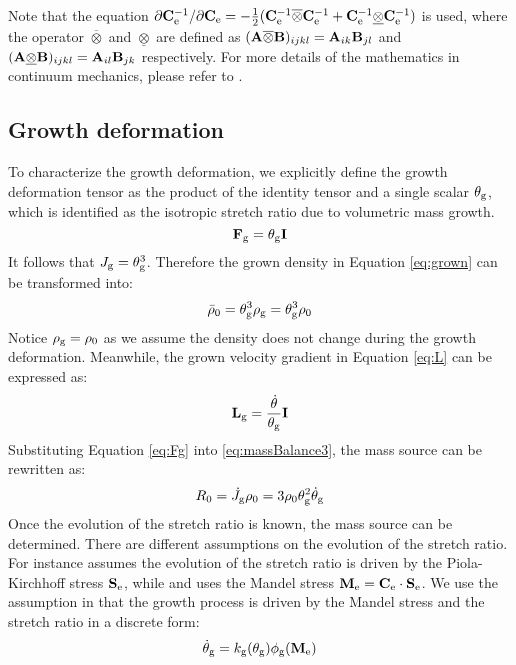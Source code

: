 Note that the equation $\partial\bold{C}_{\mathrm{e}}^{-1}/\partial\bold{C}_{\mathrm{e}} = -\frac{1}{2}(\bold{C}_{\mathrm{e}}^{-1} \overline\otimes \bold{C}_{\mathrm{e}}^{-1} + \bold{C}_{\mathrm{e}}^{-1} \underline\otimes \bold{C}_{\mathrm{e}}^{-1})$ is used, where the operator $\overline\otimes$ and $\underline\otimes$ are defined as $(\bold{A}\overline\otimes\bold{B})_{ijkl} = {\bold{A}}_{ik}{\bold{B}}_{jl}$ and $(\bold{A}\underline\otimes\bold{B})_{ijkl} = {\bold{A}}_{il}{\bold{B}}_{jk}$ respectively. For more details of the mathematics in continuum mechanics, please refer to \cite{Holzapfel}. 

\subsection{Growth deformation}
To characterize the growth deformation, we explicitly define the growth deformation tensor as the product of the identity tensor and a single scalar $\theta_{\mathrm{g}}$, which is identified as the isotropic stretch ratio due to volumetric mass growth.
\begin{equation} \label{eq:Fg}
\bold{F}_{\mathrm{g}} = \theta_{\mathrm{g}} \bold{I}
\end{equation}
It follows that $J_{\mathrm{g}} = \theta_{\mathrm{g}} ^ 3$. Therefore the grown density in Equation \ref{eq:grown} can be transformed into:
\begin{equation}
\bar{\rho}_0 = \theta_{\mathrm{g}}^3\rho_{\mathrm{g}} = \theta_{\mathrm{g}}^3\rho_0
\end{equation}
Notice $\rho_{\mathrm{g}} = \rho_0$ as we assume the density does not change during the growth deformation. Meanwhile, the grown velocity gradient in Equation \ref{eq:L} can be expressed as:
\begin{equation}
\bold{L}_{\mathrm{g}} = \frac{\dot\theta}{\theta_{\mathrm{g}}}\bold{I}
\end{equation}
Substituting Equation \ref{eq:Fg} into \ref{eq:massBalance3}, the mass source can be rewritten as:
\begin{equation} \label{eq:massBalance4}
R_0 = \dot{J}_{\mathrm{g}} \rho_0 = 3\rho_0 \theta_{\mathrm{g}}^2\dot\theta_{\mathrm{g}}
\end{equation}
Once the evolution of the stretch ratio is known, the mass source can be determined. There are different assumptions on the evolution of the stretch ratio. For instance \cite{Lubarda2} assumes the evolution of the stretch ratio is driven by the Piola-Kirchhoff stress $\bold{S}_{\mathrm{e}}$, while \cite{Goktepe2} and \cite{Himpel} uses the Mandel stress $\bold{M}_{\mathrm{e}} = \bold{C}_{\mathrm{e}} \cdot \bold{S}_{\mathrm{e}}$.
We use the assumption in \cite{Goktepe2} that the growth process is driven by the Mandel stress and the stretch ratio in a discrete form:
\begin{equation}
\dot\theta_{\mathrm{g}} = k_{\mathrm{g}}(\theta_{\mathrm{g}})\phi_{\mathrm{g}}(\bold{M}_{\mathrm{e}})
\end{equation}
